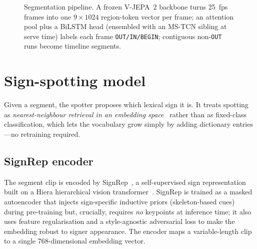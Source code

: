 \documentclass[11pt]{article}
\newcommand{\code}[1]{\texttt{\small #1}}
\begin{document}
\begin{figure}[t]
\centering
{}
\caption{Segmentation pipeline. A frozen V-JEPA~2 backbone turns 25~fps frames into one
$9\times1024$ region-token vector per frame; an attention pool plus a BiLSTM head (ensembled
with an MS-TCN sibling at serve time) labels each frame \code{OUT/IN/BEGIN}; contiguous
non-\code{OUT} runs become timeline segments.}
\label{fig:seg}
\end{figure}

\section{Sign-spotting model}\label{sec:spot}
Given a segment, the spotter proposes which lexical sign it is. It treats spotting as
\emph{nearest-neighbour retrieval in an embedding space}~\cite{momeni} rather than as
fixed-class classification, which lets the vocabulary grow simply by adding dictionary
entries---no retraining required.

\subsection{SignRep encoder}
The segment clip is encoded by SignRep~\cite{signrep}, a self-supervised sign representation
built on a Hiera hierarchical vision transformer~\cite{hiera}. SignRep is trained as a masked
autoencoder that injects sign-specific inductive priors (skeleton-based cues) during
pre-training but, crucially, requires \emph{no} keypoints at inference time; it also uses
feature regularisation and a style-agnostic adversarial loss to make the embedding robust to
signer appearance. The encoder maps a variable-length clip to a single 768-dimensional embedding
vector.
\end{document}
